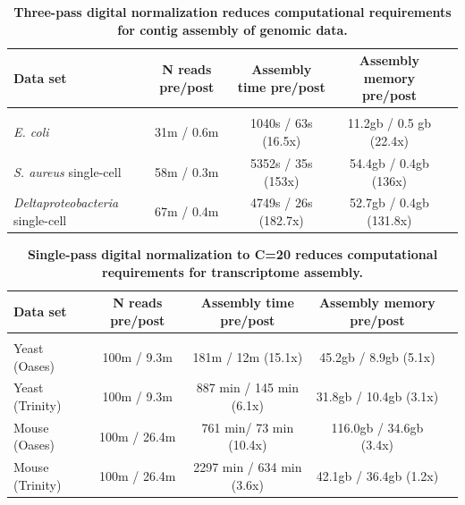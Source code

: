 \documentclass[10pt]{article}
\begin{document}

\begin{table}[!ht]
\caption{
\bf{Three-pass digital normalization reduces computational requirements for contig assembly of genomic data.}}
\begin{tabular}{|l|c|c|c|c|}

Data set & N reads pre/post & Assembly time pre/post & Assembly memory pre/post \\
\hline \\
{\em E. coli} & 31m / 0.6m & 1040s / 63s (16.5x) & 11.2gb / 0.5 gb (22.4x) \\ 
{\em S. aureus} single-cell & 58m / 0.3m & 5352s / 35s (153x) & 54.4gb / 0.4gb (136x) \\
{\em Deltaproteobacteria} single-cell & 67m / 0.4m & 4749s / 26s (182.7x) & 52.7gb / 0.4gb (131.8x) \\

\end{tabular}
\begin{flushleft}
\end{flushleft}
\label{tab:dngenome}
\end{table}




\begin{table}[!ht]
\caption{
\bf{Single-pass digital normalization to C=20 reduces computational
requirements for transcriptome assembly.}}


\begin{tabular}{|l|c|c|c|c|}

Data set & N reads pre/post & Assembly time pre/post & Assembly memory pre/post \\
 \hline \\
Yeast (Oases) & 100m / 9.3m & 181m / 12m (15.1x) & 45.2gb / 8.9gb (5.1x) \\
Yeast (Trinity) & 100m / 9.3m & 887 min / 145 min (6.1x) & 31.8gb / 10.4gb (3.1x) \\
Mouse (Oases) & 100m / 26.4m & 761 min/ 73 min (10.4x) & 116.0gb / 34.6gb (3.4x) \\
Mouse (Trinity) & 100m / 26.4m & 2297 min / 634 min (3.6x) & 42.1gb / 36.4gb (1.2x) \\
\end{tabular}

\begin{flushleft}
\end{flushleft}
\label{tab:dntrans}
\end{table}
\end{document}

